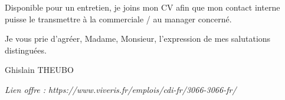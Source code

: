 \documentclass[11pt,a4paper]{article}
\begin{document}
\vspace{0.35em}
\noindent Disponible pour un entretien, je joins mon CV afin que mon contact interne puisse le transmettre \`a la commerciale / au manager concern\'e.

\vspace{0.55em}
\noindent Je vous prie d'agr\'eer, Madame, Monsieur, l'expression de mes salutations distingu\'ees.

\vspace{1.1em}
\noindent Ghislain THEUBO

\vspace{0.4em}
\noindent\textit{\small Lien offre : https://www.viveris.fr/emplois/cdi-fr/3066-3066-fr/}
\end{document}
